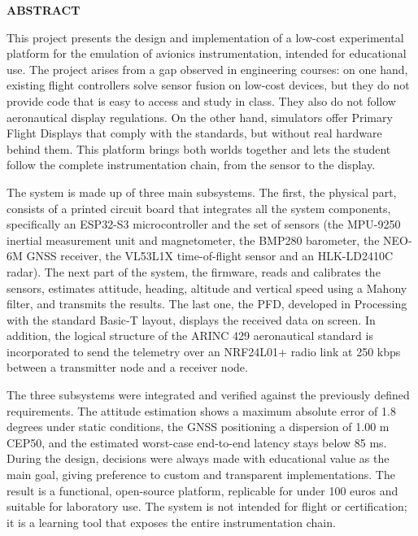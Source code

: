 
\thispagestyle{plain}

\vfill

{\Large\bfseries ABSTRACT}

\vspace{-0.5cm}

\hrulefill

This project presents the design and implementation of a low-cost experimental platform for the emulation of avionics instrumentation, intended for educational use. The project arises from a gap observed in engineering courses: on one hand, existing flight controllers solve sensor fusion on low-cost devices, but they do not provide code that is easy to access and study in class. They also do not follow aeronautical display regulations. On the other hand, simulators offer Primary Flight Displays that comply with the standards, but without real hardware behind them. This platform brings both worlds together and lets the student follow the complete instrumentation chain, from the sensor to the display.

The system is made up of three main subsystems. The first, the physical part, consists of a printed circuit board that integrates all the system components, specifically an ESP32-S3 microcontroller and the set of sensors (the MPU-9250 inertial measurement unit and magnetometer, the BMP280 barometer, the NEO-6M GNSS receiver, the VL53L1X time-of-flight sensor and an HLK-LD2410C radar). The next part of the system, the firmware, reads and calibrates the sensors, estimates attitude, heading, altitude and vertical speed using a Mahony filter, and transmits the results. The last one, the PFD, developed in Processing with the standard Basic-T layout, displays the received data on screen. In addition, the logical structure of the ARINC 429 aeronautical standard is incorporated to send the telemetry over an NRF24L01+ radio link at 250 kbps between a transmitter node and a receiver node.

The three subsystems were integrated and verified against the previously defined requirements. The attitude estimation shows a maximum absolute error of 1.8 degrees under static conditions, the GNSS positioning a dispersion of 1.00 m CEP50, and the estimated worst-case end-to-end latency stays below 85 ms. During the design, decisions were always made with educational value as the main goal, giving preference to custom and transparent implementations. The result is a functional, open-source platform, replicable for under 100 euros and suitable for laboratory use. The system is not intended for flight or certification; it is a learning tool that exposes the entire instrumentation chain.

